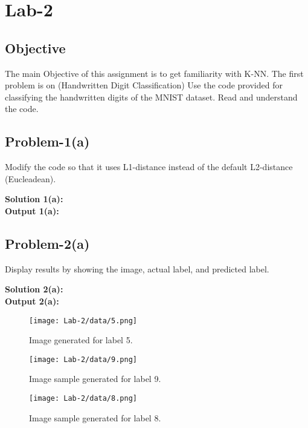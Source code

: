 \chapter{Lab-2}
\section{Objective}
The main Objective of this assignment is to get familiarity with K-NN. The first problem is on (Handwritten Digit Classification) Use the code provided for classifying the handwritten digits of the MNIST dataset. Read and understand the code.

\section{Problem-1(a)}
Modify the code so that it uses L1-distance instead of the default L2-distance (Eucleadean).

\textbf{Solution 1(a): }
\\

\textbf{Output 1(a): }
\\

\section{Problem-2(a)}
Display results by showing the image, actual label, and predicted label. 

\textbf{Solution 2(a): }
\\

\textbf{Output 2(a): }

\begin{figure}[ht]
\centering
\texttt{[image: Lab-2/data/5.png]}
\caption{Image generated for label 5.}
\label{fig:sample}
\end{figure}

\FloatBarrier

\begin{figure}[ht]
\centering
\texttt{[image: Lab-2/data/9.png]}
\caption{Image sample generated for label 9.}
\label{fig:sample}
\end{figure}

\FloatBarrier

\begin{figure}[ht]
\centering
\texttt{[image: Lab-2/data/8.png]}
\caption{Image sample generated for label 8.}
\label{fig:sample}
\end{figure}

